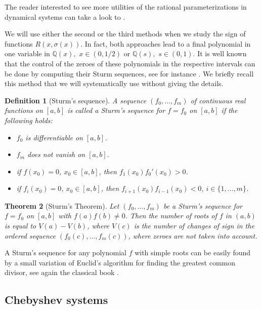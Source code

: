 \documentclass[12pt,a4paper,reqno]{amsart}
\newtheorem{teo}{Theorem}[section]
\newtheorem{defi}[teo]{Definition}
\begin{document}
The reader interested to see more utilities of the rational
parameterizations in dynamical systems can take a look to
\cite{GasLazTor2019}.


We will use either the second or the third methods when we study the
sign of functions $R(x,\sigma(x)).$ In fact, both approaches lead to
a final polynomial in one variable in $\mathbb{Q}(x),$ $x\in(0,1/2)$
or $\mathbb{Q}(s),$ $s\in(0,1).$ It is well known that the control
of the zeroes of these polynomials in the respective intervals can
be done by computing their Sturm sequences, see for instance
\cite{Sto2002}. We briefly recall this method that we will
systematically use without giving the details.




    \begin{defi}[Sturm's sequence]
        A sequence $(f_0,\ldots,f_m)$ of continuous real functions on $[a,b]$ is called a
          Sturm's sequence for $f=f_0$ on $[a,b]$ if the following holds:
        \begin{itemize}
            \item [(a)] $f_0$ is differentiable on $[a,b]$.
            \item [(b)] $f_m$ does not vanish on $[a,b]$.
            \item[(c)] if $f(x_0)= 0$, $x_0 \in [a,b]$, then $f_1(x_0) f_0'(x_0) >0$.
            \item[(d)] if $f_i(x_0)= 0$, $x_0 \in [a,b]$, then $f_{i+1}(x_0) f_{i-1}(x_0) <0$, $i \in \{1,\ldots,m\}$.
        \end{itemize}
    \end{defi}
    \begin{teo}[Sturm's Theorem]
        Let $(f_0,\ldots,f_m)$ be a Sturm's sequence for $f=f_0$ on $[a,b]$ with $f(a)f(b) \neq 0$.
          Then the number of roots of $f$ in $(a,b)$ is equal to $V(a)-V(b)$, where $V(c)$ is
           the number of changes of sign in the ordered sequence $(f_0(c),\ldots,f_m(c))$, where zeroes are not taken into account.
    \end{teo}

A Sturm's sequence for any polynomial $f$ with simple roots can be
easily found by a small variation of Euclid's  algorithm for finding
the greatest common divisor, see again the classical book
\cite{Sto2002}.


\subsection{Chebyshev systems}\label{ss:ect}
\end{document}

